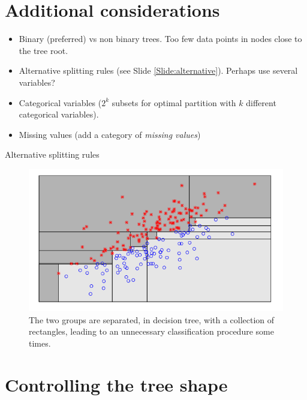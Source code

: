 \documentclass{beamer}
\begin{document}
\section{Additional considerations}

\begin{frame}
\begin{itemize}
    \item Binary (preferred) vs non binary trees. Too few data points in nodes close to the tree root.
    \item Alternative splitting rules (see Slide \ref{Slide:alternative}). Perhaps use several variables?
    \item Categorical variables ($2^k$ subsets for optimal partition with $k$ different categorical variables).
    \item Missing values (add a category of {\em missing values})
\end{itemize}
\end{frame}

\begin{frame}{Alternative splitting rules}
    \label{Slide:alternative}
    \begin{figure}
        \includegraphics[width=0.9\linewidth]{F85Kroese}
        \caption{The two groups are separated, in decision tree, with a collection of rectangles, leading to an unnecessary classification procedure some times.\cite{kroese2020}}
    \end{figure}
\end{frame}

\section{Controlling the tree shape}
\end{document}
